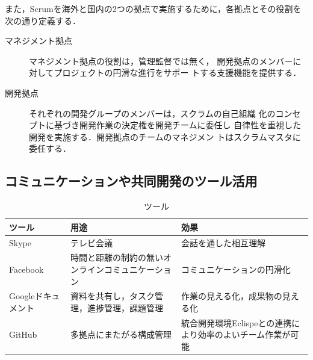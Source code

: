 \documentclass[a4j, 12Q, twocolumn, twoside]{jsarticle}
\begin{document}
また，Scrumを海外と国内の2つの拠点で実施するために，各拠点とその役割を次の通り定義する．

\begin{description}
 \item[マネジメント拠点] マネジメント拠点の役割は，管理監督では無く，
	    開発拠点のメンバーに対してプロジェクトの円滑な進行をサポー
	    トする支援機能を提供する．
 \item[開発拠点] それぞれの開発グループのメンバーは，スクラムの自己組織
	    化のコンセプトに基づき開発作業の決定権を開発チームに委任し
	    自律性を重視した開発を実施する．開発拠点のチームのマネジメン
	    トはスクラムマスタに委任する．
\end{description}


\subsection{コミュニケーションや共同開発のツール活用}

\begin{table}[h]
  \caption{ツール}
  \label{tb:Tools}
  \begin{center}
   \small
    \begin{tabular}{|p{}|p{}|p{}|}
      \hline
      ツール & 用途 & 効果 \\
      \hline
      Skype\cite{Skype} & テレビ会議 & 会話を通した相互理解 \\
      Facebook\cite{Facebook} &時間と距離の制約の無いオンラインコミュニケーション &コミュニケーションの円滑化 \\
      Googleドキュメント\cite{googledocument} & 資料を共有し，タスク管理，進捗管理，課題管理 & 作業の見える化，成果物の見える化 \\
      GitHub\cite{GitHub} & 多拠点にまたがる構成管理 &統合開発環境Eclispeとの連携により効率のよいチーム作業が可能 \\
      \hline
    \end{tabular}
  \end{center}
\end{table}
\end{document}
